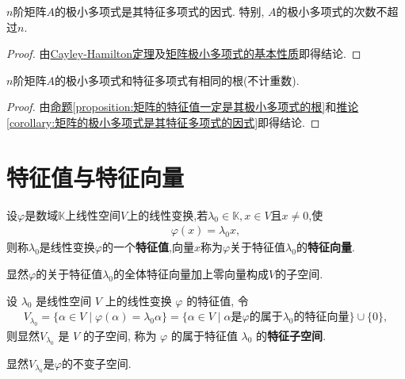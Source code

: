 \documentclass[lang=cn,newtx,10pt,scheme=chinese]{elegantbook}
\begin{document}
\begin{corollary}\label{corollary:矩阵的极小多项式是其特征多项式的因式}
$n$阶矩阵$A$的极小多项式是其特征多项式的因式. 特别, $A$的极小多项式的次数不超过$n$.
\end{corollary}
\begin{proof}
由\hyperref[theorem:Cayley-Hamilton定理]{Cayley-Hamilton定理}及\hyperref[lemma:矩阵极小多项式的基本性质]{矩阵极小多项式的基本性质}即得结论.
\end{proof}

\begin{corollary}
$n$阶矩阵$A$的极小多项式和特征多项式有相同的根(不计重数).
\end{corollary}
\begin{proof}
由\hyperref[proposition:矩阵的特征值一定是其极小多项式的根]{命题\ref{proposition:矩阵的特征值一定是其极小多项式的根}}和\hyperref[corollary:矩阵的极小多项式是其特征多项式的因式]{推论\ref{corollary:矩阵的极小多项式是其特征多项式的因式}}即得结论.
\end{proof}



\section{特征值与特征向量}

\begin{definition}[线性变换的特征值和特征向量]
设$\varphi$是数域$\mathbb{K}$上线性空间$V$上的线性变换,若$\lambda_0 \in \mathbb{K}, x \in V$且$x \neq 0$,使
\begin{align*}
\varphi(x) = \lambda_0 x,
\end{align*}
则称$\lambda_0$是线性变换$\varphi$的一个\textbf{特征值},向量$x$称为$\varphi$关于特征值$\lambda_0$的\textbf{特征向量}.
\end{definition}
\begin{note}
显然$\varphi$的关于特征值$\lambda_0$的全体特征向量加上零向量构成$V$的子空间.
\end{note}

\begin{definition}[线性变换的特征子空间]
设 $\lambda_0$ 是线性空间 $V$ 上的线性变换 $\varphi$ 的特征值, 令
\begin{align*}
V_{\lambda_0} = \{\alpha \in V \mid \varphi(\alpha) = \lambda_0 \alpha\} 
= \{\alpha \in V \mid \alpha \text{是} \varphi \text{的属于} \lambda_0 \text{的特征向量}\} \cup \{0\},
\end{align*}
则显然$V_{\lambda_0}$ 是 $V$ 的子空间, 称为 $\varphi$ 的属于特征值 $\lambda_0$ 的\textbf{特征子空间}.
\end{definition}
\begin{note}
显然$V_{\lambda_0}$是$\varphi$的不变子空间.
\end{note}
\end{document}
